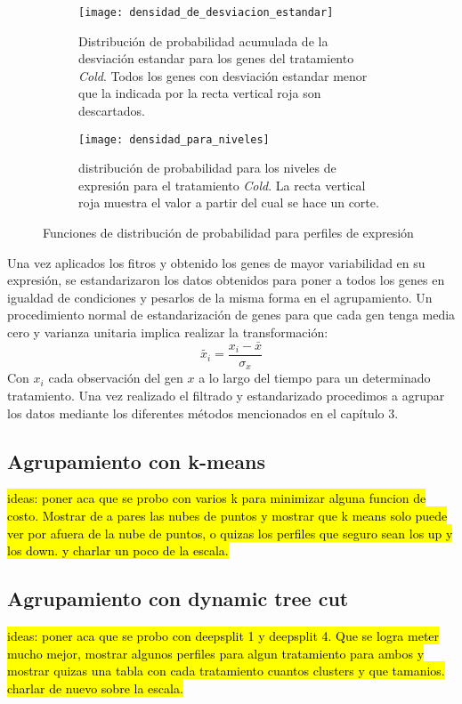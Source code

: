\begin{figure*}[t!]
    \centering
    \begin{subfigure}[t]{0.4\textwidth}
    \centering
    \texttt{[image: densidad\_de\_desviacion\_estandar]}
    \caption{Distribución de probabilidad acumulada de la desviación estandar para los genes del tratamiento \textit{Cold}. Todos los genes con desviación estandar menor que la indicada por la recta vertical roja son descartados.}
    \label{fig:densidad_de_desviacion_estandar}
    \end{subfigure}
    \begin{subfigure}[t]{0.4\textwidth}
    \centering
    \texttt{[image: densidad\_para\_niveles]}
    \caption{distribución de probabilidad para los niveles de expresión para el tratamiento \textit{Cold}. La recta vertical roja muestra el valor a partir del cual se hace un corte.}
    \label{fig:densidad_para_niveles}
    \end{subfigure}
    \caption{Funciones de distribución de probabilidad para perfiles de expresión}
\end{figure*}
Una vez aplicados los fitros y obtenido los genes de mayor variabilidad en su expresión, se estandarizaron los datos obtenidos para poner a todos los genes en igualdad de condiciones y pesarlos de la misma forma en el agrupamiento. Un procedimiento normal de estandarización de genes para que cada gen tenga media cero y varianza unitaria implica realizar la transformación:
\begin{equation}
	\tilde{x_i} = \frac{x_i-\bar{x}}{\sigma_x}
\end{equation}
Con $x_i$ cada observación del gen $x$ a lo largo del tiempo para un determinado tratamiento. Una vez realizado el filtrado y estandarizado procedimos a agrupar los datos mediante los diferentes métodos mencionados en el capítulo 3.
\subsection{Agrupamiento con k-means}
\hl{ideas: poner aca que se probo con varios k para minimizar alguna funcion de costo. Mostrar de a pares las nubes de puntos y mostrar que k means solo puede ver por afuera de la nube de puntos, o quizas los perfiles que seguro sean los up y los down. y charlar un poco de la escala.}
\subsection{Agrupamiento con dynamic tree cut}
\hl{ideas: poner aca que se probo con deepsplit 1 y deepsplit 4. Que se logra meter mucho mejor, mostrar algunos perfiles para algun tratamiento para ambos y mostrar quizas una tabla con cada tratamiento cuantos clusters y que tamanios. charlar de nuevo sobre la escala.}
